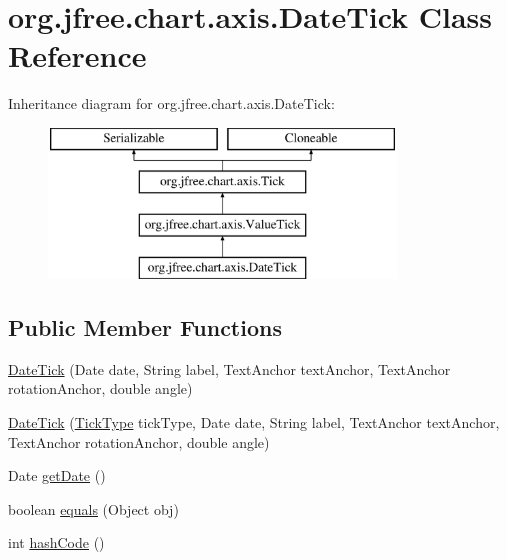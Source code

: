 \hypertarget{classorg_1_1jfree_1_1chart_1_1axis_1_1_date_tick}{}\section{org.\+jfree.\+chart.\+axis.\+Date\+Tick Class Reference}
\label{classorg_1_1jfree_1_1chart_1_1axis_1_1_date_tick}
Inheritance diagram for org.\+jfree.\+chart.\+axis.\+Date\+Tick\+:\begin{figure}[H]
\begin{center}
\leavevmode
\includegraphics[height=4.000000cm]{classorg_1_1jfree_1_1chart_1_1axis_1_1_date_tick}
\end{center}
\end{figure}
\subsection*{Public Member Functions}
\begin{DoxyCompactItemize}
\item 
\mbox{\hyperlink{classorg_1_1jfree_1_1chart_1_1axis_1_1_date_tick_ad9449571808afa34f4997424b1effbff}{Date\+Tick}} (Date date, String label, Text\+Anchor text\+Anchor, Text\+Anchor rotation\+Anchor, double angle)
\item 
\mbox{\hyperlink{classorg_1_1jfree_1_1chart_1_1axis_1_1_date_tick_a3115b55c493289f98b7b0c3a4e75f81e}{Date\+Tick}} (\mbox{\hyperlink{classorg_1_1jfree_1_1chart_1_1axis_1_1_tick_type}{Tick\+Type}} tick\+Type, Date date, String label, Text\+Anchor text\+Anchor, Text\+Anchor rotation\+Anchor, double angle)
\item 
Date \mbox{\hyperlink{classorg_1_1jfree_1_1chart_1_1axis_1_1_date_tick_a0939d28d4cec0513d75057550b39a0e7}{get\+Date}} ()
\item 
boolean \mbox{\hyperlink{classorg_1_1jfree_1_1chart_1_1axis_1_1_date_tick_a422f5a996cdcfc57d85033d691894054}{equals}} (Object obj)
\item 
int \mbox{\hyperlink{classorg_1_1jfree_1_1chart_1_1axis_1_1_date_tick_a5fce3ddb347cba8347e5017a99c11808}{hash\+Code}} ()
\end{DoxyCompactItemize}


